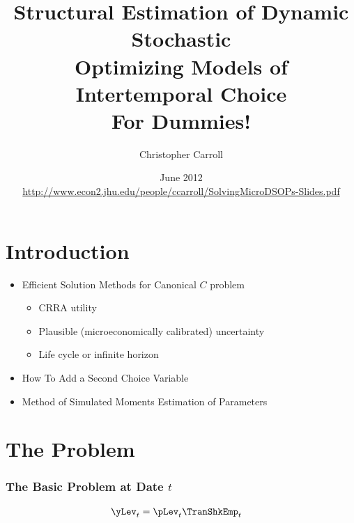 \documentclass{beamer}
\begin{document}

\title[SolvingMicroDSOPs]{\textbf{Structural Estimation of Dynamic Stochastic\\ Optimizing Models of Intertemporal Choice \\ \LARGE{For Dummies!}}}
\author[Carroll]{Christopher Carroll}

\date{June 2012 \\ {\tiny \url{http://www.econ2.jhu.edu/people/ccarroll/SolvingMicroDSOPs-Slides.pdf}}
}


\begin{frame}[plain]
  \titlepage
\end{frame}

\section{Introduction}

\begin{frame}
\begin{itemize}
\item Efficient Solution Methods for Canonical $C$ problem
\begin{itemize}
\item CRRA utility
\item Plausible (microeconomically calibrated) uncertainty
\item Life cycle or infinite horizon
\end{itemize}
\item How To Add a Second Choice Variable
\item Method of Simulated Moments Estimation of Parameters
\end{itemize}
\end{frame}

\section{The Problem}

\begin{frame}[label=MaxProb]
\frametitle{\large\textbf{The Basic Problem at Date $t$}}


\begin{equation}\begin{gathered}\begin{aligned}
{\yLev}_{t}  & = {\pLev}_{t}\TranShkEmp_{t}
\end{aligned}\end{gathered}\end{equation}

\end{frame}
\end{document}

